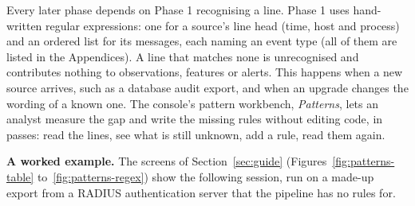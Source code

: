 \documentclass[11pt,a4paper]{article}
\begin{document}
Every later phase depends on Phase 1 recognising a line. Phase 1 uses hand-written regular expressions: one for a source's line head (time, host and process) and an ordered list for its messages, each naming an event type (all of them are listed in the Appendices). A line that matches none is unrecognised and contributes nothing to observations, features or alerts. This happens when a new source arrives, such as a database audit export, and when an upgrade changes the wording of a known one. The console's pattern workbench, \emph{Patterns}, lets an analyst measure the gap and write the missing rules without editing code, in passes: read the lines, see what is still unknown, add a rule, read them again.

\textbf{A worked example.} The screens of Section~\ref{sec:guide} (Figures~\ref{fig:patterns-table} to~\ref{fig:patterns-regex}) show the following session, run on a made-up export from a RADIUS authentication server that the pipeline has no rules for.
\end{document}
